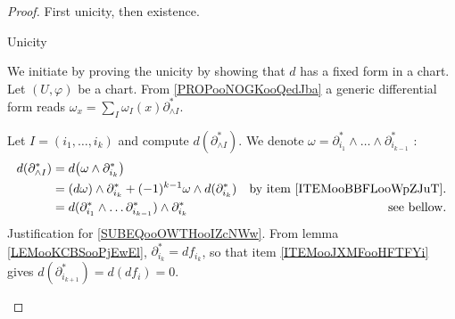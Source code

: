 \begin{proof}
	First unicity, then existence.
	\begin{proofpart}
		Unicity
	\end{proofpart}
	We initiate by proving the unicity by showing that \( d\) has a fixed form in a chart. Let \( (U,\varphi)\) be a chart. From \ref{PROPooNOGKooQedJba} a generic differential form reads \( \omega_x=\sum_I\omega_I(x)\partial^*_{\wedge I}\).

	\begin{subproof}
		\spitem[\( d(\partial^*_{\wedge I})=0\)]
		Let \( I=(i_1,\ldots,i_k)\) and compute \( d(\partial^*_{\wedge I})\). We denote \( \omega=\partial^*_{i_1}\wedge\ldots\wedge\partial^*_{i_{k-1}}\) :
		\begin{subequations}
			\begin{align}
				d(\partial^*_{\wedge I}) & = d\big( \omega\wedge \partial^*_{i_{k}} \big)                                                                                    \\
				                         & = (d\omega)\wedge\partial^*_{i_{k}}+(-1)^{k-1}\omega\wedge d(\partial^*_{i_{k}}) & \text{by item \ref{ITEMooBBFLooWpZJuT}.}       \\
				                         & = d(\partial^*_{i_1}\wedge \ldots\partial^*_{i_{k-1}})\wedge\partial^*_{i_k}     & \text{see bellow}. \label{SUBEQooOWTHooIZcNWw}
			\end{align}
		\end{subequations}
		Justification for \eqref{SUBEQooOWTHooIZcNWw}. From lemma \ref{LEMooKCBSooPjEwEl}, \( \partial^*_{i_{k}}=df_{i_k}\), so that item \ref{ITEMooJXMFooHFTFYi} gives \( d(\partial^*_{i_{k+1}})=d(df_i)=0\).


\end{subproof}
\end{proof}
